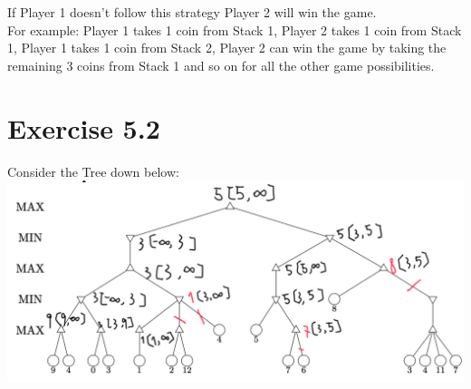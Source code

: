 \documentclass[12pt]{article}
\begin{document}
If Player 1 doesn't follow this strategy Player 2 will win the game.\\
For example: Player 1 takes 1 coin from Stack 1, Player 2 takes 1 coin from Stack 1, Player 1 takes 1 coin from Stack 2, Player 2 can win the game by taking the remaining 3 coins from Stack 1 and so on for all the other game possibilities.\\


\section*{Exercise 5.2}
Consider the Tree down below: \\
\includegraphics[width=\textwidth]{figures/5.2.png}\\
\end{document}
